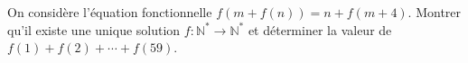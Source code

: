 On considère l'équation fonctionnelle $f(m + f(n)) = n + f(m + 4)$. Montrer qu'il existe une unique solution $f : \mathbb{N}^* \to \mathbb{N}^*$ et déterminer la valeur de $f(1) + f(2) + \cdots + f(59)$.
